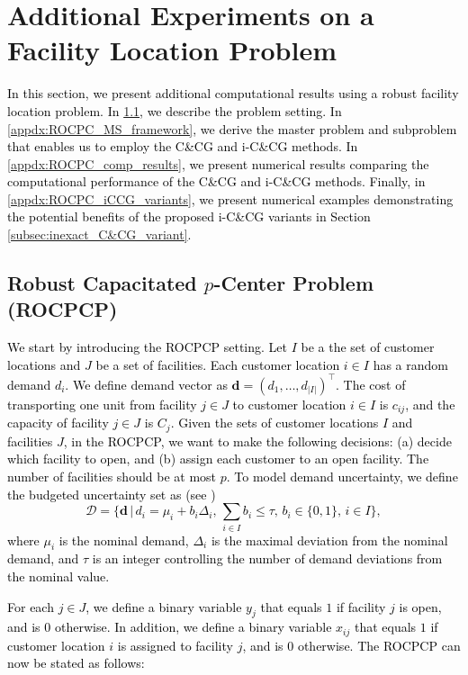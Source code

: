 \documentclass[preprint,review,11pt]{elsarticle}
\theoremstyle{definition}
\theoremstyle{remark}
\newcommand{\tp}{\top}
\newcommand{\calD}{\mathcal{D}}
\newcommand{\db}{\pmb{d}}
\newcommand{\blue}{\textcolor{black}}
\begin{document}
\section{Additional Experiments on a Facility Location Problem} \label{appdx:additional_results_ROCPCP}
\blue{
In this section, we present additional computational results using a robust facility location problem. In \ref{appdx:ROCPCP}, we describe the problem setting. In \ref{appdx:ROCPC_MS_framework}, we derive the master problem and subproblem that enables us to employ the C\&CG and i-C\&CG methods. In \ref{appdx:ROCPC_comp_results}, we present numerical results comparing the computational performance of the C\&CG and i-C\&CG methods. Finally, in \ref{appdx:ROCPC_iCCG_variants}, we present numerical examples demonstrating the potential benefits of the proposed i-C\&CG variants in Section \ref{subsec:inexact_C&CG_variant}.
}

\subsection{Robust Capacitated $p$-Center Problem (ROCPCP)} \label{appdx:ROCPCP}

\blue{
We start by introducing the ROCPCP setting. Let $I$ be a the set of customer locations and $J$ be a set of facilities. Each customer location $i\in I$ has a random demand $d_i$. We define demand vector as $\db=(d_1,\dots, d_{|I|})^\tp$. The cost of transporting one unit from facility $j\in J$ to customer location $i\in I$ is $c_{ij}$, and the capacity of facility $j\in J$ is $C_j$. Given the sets of customer locations $I$ and facilities $J$, in the ROCPCP, we want to make the following decisions: (a) decide which facility to open, and (b) assign each customer to an open facility. The number of facilities should be at most $p$. To model demand uncertainty, we define the budgeted uncertainty set as (see )
%
\begin{equation} \label{eqn:budget_uncertainty_set}
    \calD=\Bigg\{ \db \,\Bigg|\,d_i = \mu_i + b_i\Delta_i,\, \sum_{i\in I} b_i \leq \tau,\, b_i\in\{0,1\},\, i\in I\Bigg\},
\end{equation}
%
where $\mu_i$ is the nominal demand, $\Delta_i$ is the maximal deviation from the nominal demand, and $\tau$ is an integer controlling the number of demand deviations from the nominal value.
}


\blue{For each $j\in J$, we define a binary variable $y_j$ that equals $1$ if facility $j$ is open, and is $0$ otherwise. In addition, we define a binary variable $x_{ij}$ that equals $1$ if customer location $i$ is assigned to facility $j$, and is $0$ otherwise. The ROCPCP can now be stated as follows:}
\end{document}
